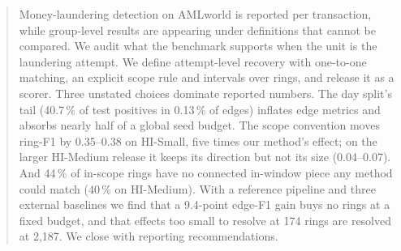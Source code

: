 \begin{abstract}
Money-laundering detection on AMLworld is reported per transaction, while group-level results
are appearing under definitions that cannot be compared. We audit what the benchmark supports
when the unit is the laundering attempt. We define attempt-level recovery with one-to-one
matching, an explicit scope rule and intervals over rings, and release it as a scorer. Three
unstated choices dominate reported numbers. The day split's tail (40.7\,\% of test positives in
0.13\,\% of edges) inflates edge metrics and absorbs nearly half of a global seed budget.
The scope convention moves ring-F1 by 0.35--0.38 on HI-Small, five times our method's effect;
on the larger HI-Medium release it keeps its direction but not its size (0.04--0.07).
And 44\,\% of in-scope rings have no connected in-window piece any method could match (40\,\% on
HI-Medium).
With a reference pipeline and three external baselines we find that a 9.4-point edge-F1 gain
buys no rings at a fixed budget, and that effects too small to resolve at 174 rings are
resolved at 2{,}187. We close with reporting recommendations.
\end{abstract}
